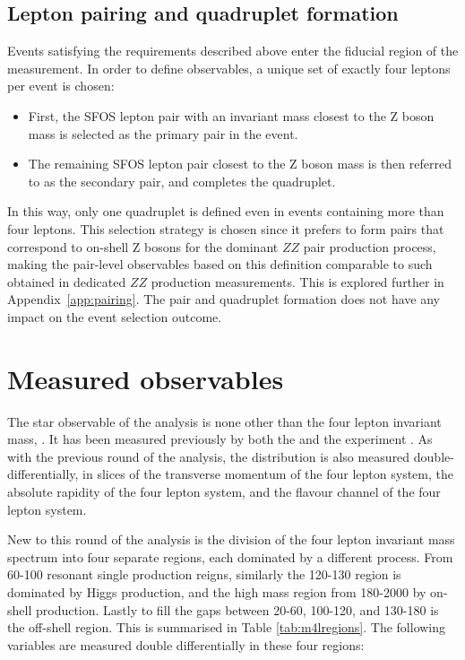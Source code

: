 
\subsection*{Lepton pairing and quadruplet formation} 
Events satisfying the requirements described above enter the fiducial region of the measurement. 
In order to define observables, a unique set of exactly four leptons per event is chosen: 
\begin{itemize}
\item First, the SFOS lepton pair with an invariant mass closest to the Z boson mass is selected as the primary pair in the event. 
\item The remaining SFOS lepton pair closest to the Z boson mass is then referred to as the secondary pair, and completes the quadruplet. 
\end{itemize}
In this way, only one quadruplet is defined even in events containing more than four leptons.
This selection strategy is chosen since it prefers to form pairs that correspond to on-shell Z bosons for the dominant $ZZ$ pair production process, making the pair-level observables based on this definition comparable to such obtained in dedicated $ZZ$ production measurements. This is explored further in Appendix~\ref{app:pairing}. 
The pair and quadruplet formation does not have any impact on the event selection outcome. 

\section{Measured observables}

The star observable of the analysis is none other than the four lepton invariant mass, \mFourL. It has been measured previously by both the \ATLAS and the \CMS experiment  \cite{}. As with the previous round of the analysis, the \mFourL distribution is also measured double-differentially, in slices of the transverse momentum of the four lepton system, the absolute rapidity of the four lepton system, and the flavour channel of the four lepton system. 

New to this round of the analysis is the division of the four lepton invariant mass spectrum into four separate regions, each dominated by a different process. From \unit{60}{\GeV}-\unit{100}{\GeV} resonant single \Z production reigns, similarly the \unit{120}{\GeV}-\unit{130}{\GeV} region is dominated by Higgs production, and the high mass region from \unit{180}{\GeV}-\unit{2000}{\GeV} by on-shell \ZZ production. Lastly to fill the gaps between  \unit{20}{\GeV}-\unit{60}{\GeV}, \unit{100}{\GeV}-\unit{120}{\GeV}, and \unit{130}{\GeV}-\unit{180}{\GeV} is the off-shell \ZZ region. This is summarised in Table \ref{tab:m4lregions}. The following variables are measured double differentially in these four regions:


